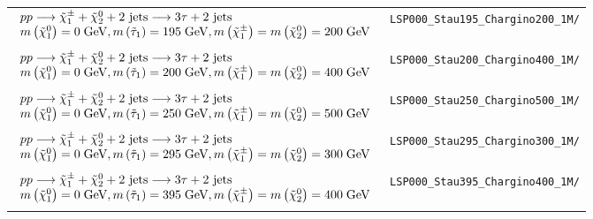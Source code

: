 \begin{table}[ht]
{\begin{tabular}{| l | l |}
			$\begin{array}{l}
			pp \longrightarrow \tilde{\chi}^{\pm}_{1} + \tilde{\chi}^{0}_{2} + 2\text{ jets} \longrightarrow 3\tau + 2\text{ jets} \\
			m\left(\tilde{\chi}^{0}_{1}\right) = 0\;\text{Ge}\kern-0.06667em\text{V}, 
			m\left(\tilde{\tau}_{1}\right) = 195\;\text{Ge}\kern-0.06667em\text{V},
			m\left(\tilde{\chi}^{\pm}_{1}\right)  = m\left(\tilde{\chi}^{0}_{2}\right) = 200\;\text{Ge}\kern-0.06667em\text{V} \\
			\end{array}$ & \texttt{LSP000\_Stau195\_Chargino200\_1M/}	\\
			&\\	

			$\begin{array}{l}
			pp \longrightarrow \tilde{\chi}^{\pm}_{1} + \tilde{\chi}^{0}_{2} + 2\text{ jets} \longrightarrow 3\tau + 2\text{ jets} \\
			m\left(\tilde{\chi}^{0}_{1}\right) = 0\;\text{Ge}\kern-0.06667em\text{V}, 
			m\left(\tilde{\tau}_{1}\right) = 200\;\text{Ge}\kern-0.06667em\text{V},
			m\left(\tilde{\chi}^{\pm}_{1}\right)  = m\left(\tilde{\chi}^{0}_{2}\right) = 400\;\text{Ge}\kern-0.06667em\text{V} \\
			\end{array}$ & \texttt{LSP000\_Stau200\_Chargino400\_1M/}	\\
			&\\	

			$\begin{array}{l}
			pp \longrightarrow \tilde{\chi}^{\pm}_{1} + \tilde{\chi}^{0}_{2} + 2\text{ jets} \longrightarrow 3\tau + 2\text{ jets} \\
			m\left(\tilde{\chi}^{0}_{1}\right) = 0\;\text{Ge}\kern-0.06667em\text{V}, 
			m\left(\tilde{\tau}_{1}\right) = 250\;\text{Ge}\kern-0.06667em\text{V},
			m\left(\tilde{\chi}^{\pm}_{1}\right)  = m\left(\tilde{\chi}^{0}_{2}\right) = 500\;\text{Ge}\kern-0.06667em\text{V} \\
			\end{array}$ & \texttt{LSP000\_Stau250\_Chargino500\_1M/}	\\
			&\\	

			$\begin{array}{l}
			pp \longrightarrow \tilde{\chi}^{\pm}_{1} + \tilde{\chi}^{0}_{2} + 2\text{ jets} \longrightarrow 3\tau + 2\text{ jets} \\
			m\left(\tilde{\chi}^{0}_{1}\right) = 0\;\text{Ge}\kern-0.06667em\text{V}, 
			m\left(\tilde{\tau}_{1}\right) = 295\;\text{Ge}\kern-0.06667em\text{V},
			m\left(\tilde{\chi}^{\pm}_{1}\right)  = m\left(\tilde{\chi}^{0}_{2}\right) = 300\;\text{Ge}\kern-0.06667em\text{V} \\
			\end{array}$ & \texttt{LSP000\_Stau295\_Chargino300\_1M/}	\\
			&\\	

			$\begin{array}{l}
			pp \longrightarrow \tilde{\chi}^{\pm}_{1} + \tilde{\chi}^{0}_{2} + 2\text{ jets} \longrightarrow 3\tau + 2\text{ jets} \\
			m\left(\tilde{\chi}^{0}_{1}\right) = 0\;\text{Ge}\kern-0.06667em\text{V}, 
			m\left(\tilde{\tau}_{1}\right) = 395\;\text{Ge}\kern-0.06667em\text{V},
			m\left(\tilde{\chi}^{\pm}_{1}\right)  = m\left(\tilde{\chi}^{0}_{2}\right) = 400\;\text{Ge}\kern-0.06667em\text{V} \\
			\end{array}$ & \texttt{LSP000\_Stau395\_Chargino400\_1M/}	\\
			&\\	


\end{tabular}}
\end{table}

